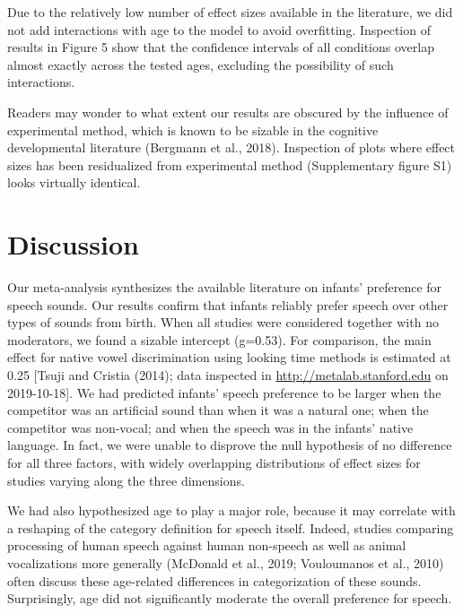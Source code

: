 \documentclass[man,floatsintext]{apa6}
\begin{document}
Due to the relatively low number of effect sizes available in the
literature, we did not add interactions with age to the model to avoid
overfitting. Inspection of results in Figure 5 show that the confidence
intervals of all conditions overlap almost exactly across the tested
ages, excluding the possibility of such interactions.

Readers may wonder to what extent our results are obscured by the
influence of experimental method, which is known to be sizable in the
cognitive developmental literature (Bergmann et al., 2018). Inspection
of plots where effect sizes has been residualized from experimental
method (Supplementary figure S1) looks virtually identical.

\section{Discussion}\label{discussion}

Our meta-analysis synthesizes the available literature on infants'
preference for speech sounds. Our results confirm that infants reliably
prefer speech over other types of sounds from birth. When all studies
were considered together with no moderators, we found a sizable
intercept (g=0.53). For comparison, the main effect for native vowel
discrimination using looking time methods is estimated at 0.25 {[}Tsuji
and Cristia (2014); data inspected in \url{http://metalab.stanford.edu}
on 2019-10-18{]}. We had predicted infants' speech preference to be
larger when the competitor was an artificial sound than when it was a
natural one; when the competitor was non-vocal; and when the speech was
in the infants' native language. In fact, we were unable to disprove the
null hypothesis of no difference for all three factors, with widely
overlapping distributions of effect sizes for studies varying along the
three dimensions.

We had also hypothesized age to play a major role, because it may
correlate with a reshaping of the category definition for speech itself.
Indeed, studies comparing processing of human speech against human
non-speech as well as animal vocalizations more generally (McDonald et
al., 2019; Vouloumanos et al., 2010) often discuss these age-related
differences in categorization of these sounds. Surprisingly, age did not
significantly moderate the overall preference for speech.
\end{document}
